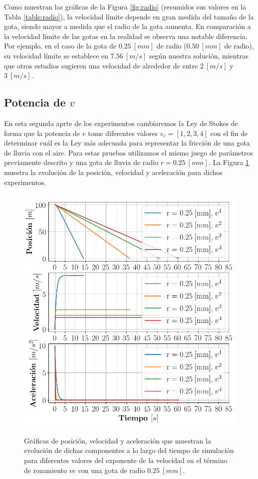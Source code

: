 \documentclass[journal]{IEEEtran}
\begin{document}
\newpage

Como muestran las gráficas de la Figura \ref{fig:radio} (resumidos sus valores en la Tabla \ref{table:radio}), la velocidad límite depende en gran medida del tamaño de la gota, siendo mayor a medida que el radio de la gota aumenta. En comparación a la velocidad límite de las gotas en la realidad se observa una notable diferencia. Por ejemplo, en el caso de la gota de $0.25~[mm
]$ de radio ($0.50~[mm]$ de radio), su velocidad límite se establece en $7.56~[m/s]$ según nuestra solución, mientras que otros estudios \cite{Holladay} \cite{Spilhaus} \cite{Beard} sugieren una velocidad de alrededor de entre $2~[m/s]$ y $3~[m/s]$.

\subsection{Potencia de $v$}

En esta segunda aprte de los experimentos cambiaremos la Ley de Stokes de forma que la potencia de $v$ tome diferentes valores $v_e = [1, 2, 3, 4]$ con el fin de determinar cuál es la Ley más adecuada para representar la fricción de una gota de lluvia con el aire. Para estas pruebas utilizamos el mismo juego de parámetros previamente descrito y una gota de lluvia de radio $r = 0.25~[mm]$. La Figura \ref{fig:ve} muestra la evolución de la posición, velocidad y aceleración para
dichos experimentos.

\begin{figure}[!htb]
	\centering
	\includegraphics[width=\linewidth]{ve}
  \label{fig:ve}
  \caption{Gráficas de posición, velocidad y aceleración que muestran la evolución de dichas componentes a lo largo del tiempo de simulación para diferentes valores del exponente de la velocidad en el término de rozamiento $ve$ con una gota de radio $0.25~[mm]$.}
\end{figure}
\end{document}
